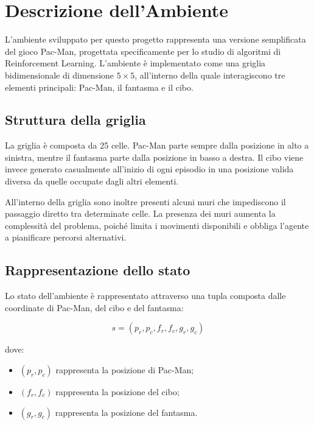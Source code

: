 \documentclass[12pt,a4paper]{report}
\begin{document}
\chapter{Descrizione dell’Ambiente}

L’ambiente sviluppato per questo progetto rappresenta una versione semplificata del gioco Pac-Man, progettata specificamente per lo studio di algoritmi di Reinforcement Learning. L’ambiente è implementato come una griglia bidimensionale di dimensione $5 \times 5$, all’interno della quale interagiscono tre elementi principali: Pac-Man, il fantasma e il cibo.

\section{Struttura della griglia}

La griglia è composta da 25 celle. Pac-Man parte sempre dalla posizione in alto a sinistra, mentre il fantasma parte dalla posizione in basso a destra. Il cibo viene invece generato casualmente all’inizio di ogni episodio in una posizione valida diversa da quelle occupate dagli altri elementi.

All’interno della griglia sono inoltre presenti alcuni muri che impediscono il passaggio diretto tra determinate celle. La presenza dei muri aumenta la complessità del problema, poiché limita i movimenti disponibili e obbliga l’agente a pianificare percorsi alternativi.

\section{Rappresentazione dello stato}

Lo stato dell’ambiente è rappresentato attraverso una tupla composta dalle coordinate di Pac-Man, del cibo e del fantasma:

\begin{equation}
s = (p_r, p_c, f_r, f_c, g_r, g_c)
\end{equation}

dove:

\begin{itemize}
    \item $(p_r,p_c)$ rappresenta la posizione di Pac-Man;
    \item $(f_r,f_c)$ rappresenta la posizione del cibo;
    \item $(g_r,g_c)$ rappresenta la posizione del fantasma.
\end{itemize}
\end{document}
